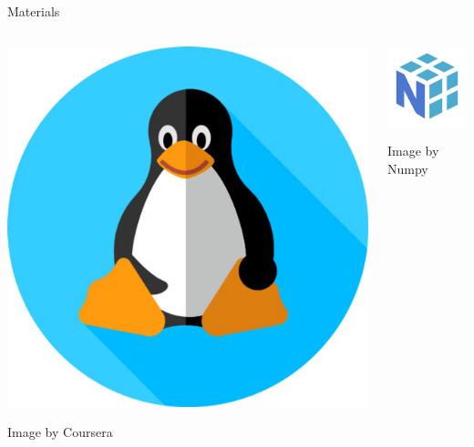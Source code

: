 \documentclass{beamer}
\begin{document}
\begin{frame}{Materials}
    \begin{columns}
        \begin{column}{0.5\textwidth}
            \centering
            \includegraphics[scale = 0.11]{linux.png}
            
            Image by Coursera
         \end{column}
         \begin{column}{0.5\textwidth}
         \centering
            \includegraphics[scale = 0.8]{numpy.png}

            Image by Numpy
         \end{column}
    \end{columns}
\end{frame}
\end{document}
